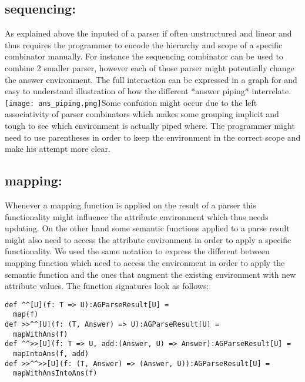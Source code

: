 \subsection{sequencing:  }
As explained above the inputed of a parser if often unstructured and linear and thus requires the programmer to encode the hierarchy and scope of a specific combinator manually. 
For instance the sequencing combinator can be used to combine 2 smaller parser, however each of those parser might potentially change the answer environment.
The full interaction can be expressed in a graph for and easy to understand illustration of how the different *answer piping* interrelate.
\texttt{[image: ans\_piping.png]}Some confusion might occur due to the left associativity of parser combinators which makes some grouping implicit and tough to see which environment is actually piped where.
The programmer might need to use parentheses in order to keep the environment in the correct scope and make his attempt more clear.


\subsection{mapping: }
Whenever a mapping function is applied on the result of a parser this functionality might influence the attribute environment which thus needs updating. On the other hand some semantic functions applied to a parse result might also need to access the attribute environment in order to apply a specific functionality. We used the same notation to express the different between mapping function which need to access the environment in order to apply the semantic function and the ones that augment the existing environment with new attribute values.
The function signatures look as follows:

\begin{lstlisting}
def ^^[U](f: T => U):AGParseResult[U] =
  map(f)
def >>^^[U](f: (T, Answer) => U):AGParseResult[U] =
  mapWithAns(f)
def ^^>>[U](f: T => U, add:(Answer, U) => Answer):AGParseResult[U] =
  mapIntoAns(f, add)
def >>^^>>[U](f: (T, Answer) => (Answer, U)):AGParseResult[U] =
  mapWithAnsIntoAns(f)
\end{lstlisting}

